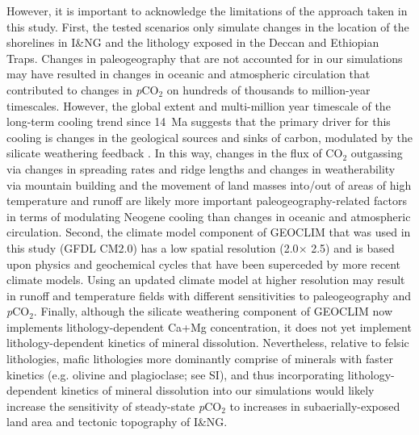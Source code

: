 \documentclass[11pt,letterpaper]{article}
\newcommand{\degrees}{\textdegree\xspace}
\newcommand{\pCOtwo}{\textit{p}CO$_{2}$\xspace}
\newcommand{\COtwo}{CO$_{2}$\xspace}
\begin{document}
However, it is important to acknowledge the limitations of the approach taken in this study. First, the tested scenarios only simulate changes in the location of the shorelines in I\&NG and the lithology exposed in the Deccan and Ethiopian Traps. Changes in paleogeography that are not accounted for in our simulations may have resulted in changes in oceanic and atmospheric circulation \citep{Haug1998a, Shevenell2004a, Holbourn2015a, Molnar2015a} that contributed to changes in \pCOtwo on hundreds of thousands to million-year timescales. However, the global extent and multi-million year timescale of the long-term cooling trend since 14~Ma suggests that the primary driver for this cooling is changes in the geological sources and sinks of carbon, modulated by the silicate weathering feedback \citep{Walker1981a, Raymo1991a, Berner1997a, Kump1997a, Berner2001a}. In this way, changes in the flux of \COtwo outgassing via changes in spreading rates and ridge lengths \citep{Rowan2016a} and changes in weatherability via mountain building and the movement of land masses into/out of areas of high temperature and runoff are likely more important paleogeography-related factors in terms of modulating Neogene cooling than changes in oceanic and atmospheric circulation. Second, the climate model component of GEOCLIM that was used in this study (GFDL CM2.0) has a low spatial resolution (2.0\degrees $\times$ 2.5\degrees) and is based upon physics and geochemical cycles that have been superceded by more recent climate models. Using an updated climate model at higher resolution may result in runoff and temperature fields with different sensitivities to paleogeography and \pCOtwo. Finally, although the silicate weathering component of GEOCLIM now implements lithology-dependent Ca+Mg concentration, it does not yet implement lithology-dependent kinetics of mineral dissolution. Nevertheless, relative to felsic lithologies, mafic lithologies more dominantly comprise of minerals with faster kinetics (e.g. olivine and plagioclase; see SI), and thus incorporating lithology-dependent kinetics of mineral dissolution into our simulations would likely increase the sensitivity of steady-state \pCOtwo to increases in subaerially-exposed land area and tectonic topography of I\&NG.



\end{document}
